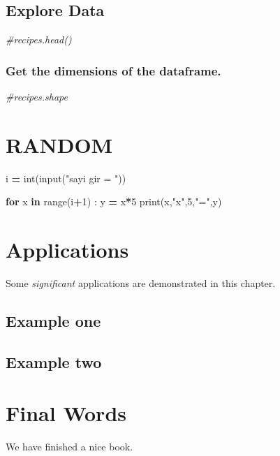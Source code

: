 \documentclass[
]{book}
\newenvironment{Shaded}{\begin{snugshade}}{\end{snugshade}}
\newcommand{\BuiltInTok}[1]{#1}
\newcommand{\CommentTok}[1]{\textcolor[rgb]{0.56,0.35,0.01}{\textit{#1}}}
\newcommand{\ControlFlowTok}[1]{\textcolor[rgb]{0.13,0.29,0.53}{\textbf{#1}}}
\newcommand{\DecValTok}[1]{\textcolor[rgb]{0.00,0.00,0.81}{#1}}
\newcommand{\KeywordTok}[1]{\textcolor[rgb]{0.13,0.29,0.53}{\textbf{#1}}}
\newcommand{\NormalTok}[1]{#1}
\newcommand{\OperatorTok}[1]{\textcolor[rgb]{0.81,0.36,0.00}{\textbf{#1}}}
\newcommand{\StringTok}[1]{\textcolor[rgb]{0.31,0.60,0.02}{#1}}
\begin{document}
\hypertarget{explore-data}{%
\section{Explore Data}\label{explore-data}}

\begin{Shaded}
\begin{Highlighting}[]
\CommentTok{\#recipes.head()}
\end{Highlighting}
\end{Shaded}

\hypertarget{get-the-dimensions-of-the-dataframe.}{%
\subsection{Get the dimensions of the dataframe.}\label{get-the-dimensions-of-the-dataframe.}}

\begin{Shaded}
\begin{Highlighting}[]
\CommentTok{\#recipes.shape}
\end{Highlighting}
\end{Shaded}

\hypertarget{random}{%
\chapter{RANDOM}\label{random}}

\begin{Shaded}
\begin{Highlighting}[]
\NormalTok{i }\OperatorTok{=} \BuiltInTok{int}\NormalTok{(}\BuiltInTok{input}\NormalTok{(}\StringTok{"sayi gir = "}\NormalTok{))}

\ControlFlowTok{for}\NormalTok{ x }\KeywordTok{in} \BuiltInTok{range}\NormalTok{(i}\OperatorTok{+}\DecValTok{1}\NormalTok{) :}
\NormalTok{  y }\OperatorTok{=}\NormalTok{ x}\OperatorTok{*}\DecValTok{5}
  \BuiltInTok{print}\NormalTok{(x,}\StringTok{"x"}\NormalTok{,}\DecValTok{5}\NormalTok{,}\StringTok{"="}\NormalTok{,y)}
\end{Highlighting}
\end{Shaded}

\hypertarget{applications}{%
\chapter{Applications}\label{applications}}

Some \emph{significant} applications are demonstrated in this chapter.

\hypertarget{example-one}{%
\section{Example one}\label{example-one}}

\hypertarget{example-two}{%
\section{Example two}\label{example-two}}

\hypertarget{final-words}{%
\chapter{Final Words}\label{final-words}}

We have finished a nice book.

  
\end{document}
